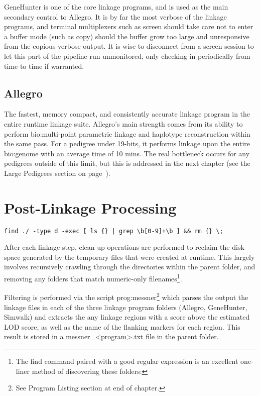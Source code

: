 GeneHunter is one of the core linkage programs, and is used as the main secondary control to Allegro. It is by far the most verbose of the linkage programs, and terminal multiplexers such as screen should take care not to enter a buffer mode (such as copy) should the buffer grow too large and unresponsive from the copious verbose output. It is wise to disconnect from a screen session to let this part of the pipeline run unmonitored, only checking in periodically from time to time if warranted.

\subsection{Allegro}

The fastest, memory compact, and consistently accurate linkage program in the entire runtime linkage suite. Allegro's main strength comes from its ability to perform \gls{bio:multi-point parametric} linkage and haplotype reconstruction within the same pass. For a pedigree under 19-bits, it performs linkage upon the entire \gls{bio:genome} with an average time of 10 mins. The real bottleneck occurs for any pedigrees outside of this limit, but this is addressed in the next chapter (see the Large Pedigrees section on page~\pageref{ref:meth:largepeds}).


\section{Post-Linkage Processing}

\begin{lrbox}\myVerb\scriptsize
\verb!find ./ -type d -exec [ ls {} | grep \b[0-9]+\b ] && rm {} \;!
\end{lrbox}%

After each linkage step, clean up operations are performed to reclaim the disk space generated by the temporary files that were created at runtime. This largely involves recursively crawling through the directories within the parent folder, and removing any folders that match numeric-only filenames\footnote{The find command paired with a good regular expression is an excellent one-liner method of discovering these folders: \usebox\myVerb}.

Filtering is performed via the script \gls{prog:messner}\footnote{See Program Listing section at end of chapter.} which parses the output the linkage files in each of the three linkage program folders (Allegro, GeneHunter, Simwalk) and extracts the any linkage regions with a score above the estimated LOD score, as well as the name of the flanking markers for each region. This result is stored in a messner\_<program>.txt file in the parent folder.

